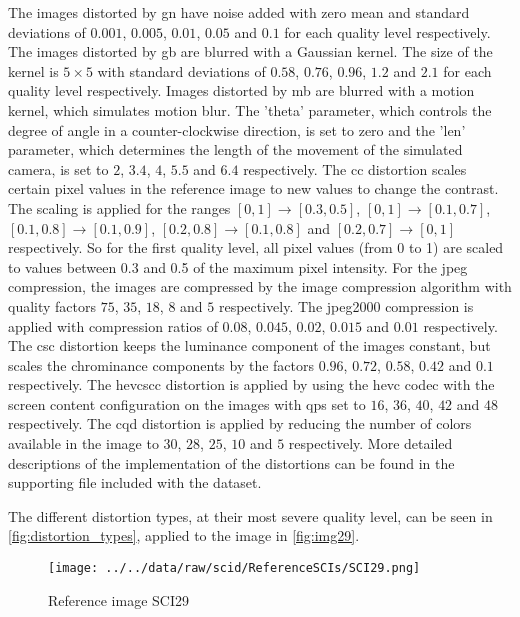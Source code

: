 The images distorted by \gls{gn} have noise added with zero mean and standard deviations of $0.001$, $0.005$, $0.01$, $0.05$ and $0.1$ for each quality level respectively.
The images distorted by \gls{gb} are blurred with a Gaussian kernel.
The size of the kernel is $5\times5$ with standard deviations of $0.58$, $0.76$, $0.96$, $1.2$ and $2.1$ for each quality level respectively.
Images distorted by \gls{mb} are blurred with a motion kernel, which simulates motion blur.
The 'theta' parameter, which controls the degree of angle in a counter-clockwise direction, is set to zero and the 'len' parameter, which determines the length of the movement of the simulated camera, is set to $2$, $3.4$, $4$, $5.5$ and $6.4$ respectively.
The \gls{cc} distortion scales certain pixel values in the reference image to new values to change the contrast.
The scaling is applied for the ranges $[0,1] \rightarrow [0.3,0.5]$, $[0,1] \rightarrow [0.1,0.7]$, $[0.1,0.8] \rightarrow [0.1,0.9]$, $[0.2,0.8] \rightarrow [0.1,0.8]$ and $[0.2,0.7] \rightarrow [0,1]$ respectively.
So for the first quality level, all pixel values (from 0 to 1) are scaled to values between 0.3 and 0.5 of the maximum pixel intensity.
For the \gls{jpeg} compression, the images are compressed by the image compression algorithm with quality factors $75$, $35$, $18$, $8$ and $5$ respectively.
The \gls{jpeg2000} compression is applied with compression ratios of $0.08$, $0.045$, $0.02$, $0.015$ and $0.01$ respectively.
The \gls{csc} distortion keeps the luminance component of the images constant, but scales the chrominance components by the factors $0.96$, $0.72$, $0.58$, $0.42$ and $0.1$ respectively.
The \gls{hevcscc} distortion is applied by using the \gls{hevc} codec with the screen content configuration on the images with \glspl{qp} set to $16$, $36$, $40$, $42$ and $48$ respectively.
The \gls{cqd} distortion is applied by reducing the number of colors available in the image to $30$, $28$, $25$, $10$ and $5$ respectively.
More detailed descriptions of the implementation of the distortions can be found in the supporting file included with the dataset.

The different distortion types, at their most severe quality level, can be seen in \autoref{fig:distortion_types}, applied to the image in \autoref{fig:img29}.

\begin{figure}[h!]
    \centering
    \texttt{[image: ../../data/raw/scid/ReferenceSCIs/SCI29.png]}
    \caption{Reference image SCI29}
    \label{fig:img29}
\end{figure}

